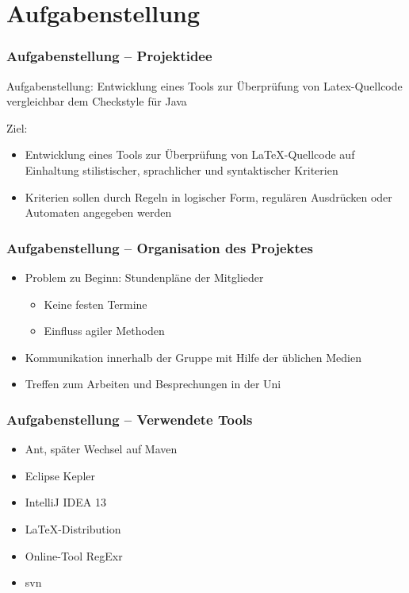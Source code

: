 \section{Aufgabenstellung}
\begin{frame}
\frametitle{Aufgabenstellung -- Projektidee}
\begin{block}{Aufgabenstellung:}
    Entwicklung eines Tools zur Überprüfung von Latex-Quellcode vergleichbar dem Checkstyle für Java
\end{block}
\begin{block}{Ziel:}
    \begin{itemize}
        \item Entwicklung eines Tools zur Überprüfung von LaTeX-Quellcode auf Einhaltung stilistischer, sprachlicher und syntaktischer Kriterien
        \item Kriterien sollen durch Regeln in logischer Form, regulären Ausdrücken oder Automaten angegeben werden
    \end{itemize}
\end{block}
\end{frame}
\begin{frame}
\frametitle{Aufgabenstellung -- Organisation des Projektes}
\begin{block}{\vspace*{-3ex}}
	\begin{itemize}
	  	\item Problem zu Beginn: Stundenpläne der Mitglieder
	  	\begin{itemize}
	  		\item Keine festen Termine
	  		\item Einfluss agiler Methoden
	  	\end{itemize}
	  	\item Kommunikation innerhalb der Gruppe mit Hilfe der üblichen Medien
	  	\item Treffen zum Arbeiten und Besprechungen in der Uni
	\end{itemize}
\end{block}
\end{frame}
\begin{frame}
\frametitle{Aufgabenstellung -- Verwendete Tools}
\begin{block}{\vspace*{-3ex}}
	\begin{itemize}
	 	\item Ant, später Wechsel auf Maven
	  	\item Eclipse Kepler
	  	\item IntelliJ IDEA 13
	  	\item \LaTeX-Distribution
	  	\item Online-Tool RegExr
	  	\item svn 
	\end{itemize}
\end{block}
\end{frame}
